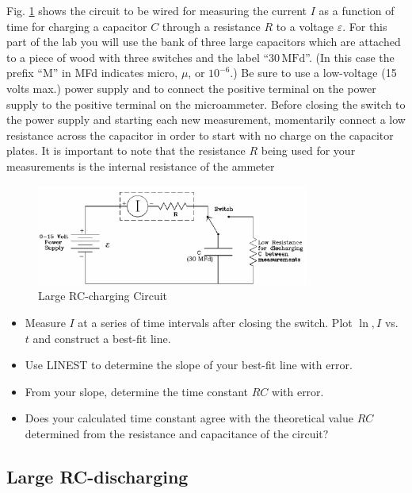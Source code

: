 Fig. \ref{fig:largerccharge} shows the circuit to be wired for measuring the current $I$ as a function of time for charging a capacitor $C$ through a resistance $R$ to a voltage $\varepsilon$. For this part of the lab you will use the bank of three large capacitors which are attached to a piece of wood with three switches and the label ``$30\,\mathrm{MFd}$''. (In this case the prefix ``M'' in MFd indicates micro, $\mu$, or $10^{-6}$.) Be sure to use a low-voltage (15 volts max.) power supply and to connect the positive terminal on the power supply to the positive terminal on the microammeter. Before closing the switch to the power supply and starting each new measurement, momentarily connect a low resistance across the capacitor in order to start with no charge on the capacitor plates. It is important to note that the resistance $R$ being used for your measurements is the internal resistance of the ammeter\myskip
\begin{figure}[h]
    \begin{center}
        \includegraphics[width=0.8\textwidth]{./Exp4/pic/image6.png}
    \end{center}
    \caption{Large RC-charging Circuit}
    \label{fig:largerccharge}
\end{figure}

\begin{itemize}
  \item Measure $I$ at a series of time intervals after closing the switch. Plot $\ln,I$ vs. $t$ and construct a best-fit line.
  \item Use LINEST to determine the slope of your best-fit line with error.
  \item From your slope, determine the time constant $RC$ with error.
  \item Does your calculated time constant agree with the theoretical value $RC$ determined from the resistance and capacitance of the circuit?
\end{itemize}

\subsection{Large RC-discharging}

